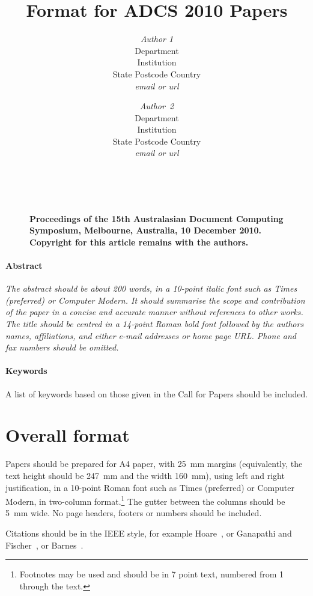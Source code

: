 \documentclass[twocolumn]{article}
\title{Format for ADCS 2010 Papers}
\author{{\em Author 1}\\[1ex]
        Department\\Institution\\State Postcode Country\\[1ex]
        {\em email or url} \and
        {\em Author~2}\\[1ex]
        Department\\Institution\\State Postcode Country\\[1ex]
        {\em email or url}}
\date{}
\begin{document}
\maketitle
\thispagestyle{empty}


        \begin{figure}[b]
	~\\
        \noindent
        {\small\raggedright\bf
        Proceedings of the 15th Australasian 
	Document Computing Symposium,
	Melbourne, Australia,
        10 December 2010.
	Copyright for this article remains with the authors.
        }
        \end{figure}


\paragraph*{Abstract}
\noindent
{\it 
The abstract should be about 200 words, in a 10-point italic
font such as Times (preferred) or Computer Modern.
It should summarise the scope and contribution of the paper in a
concise and accurate manner without references to other works.
The title should be centred in a 14-point Roman bold font followed by
the authors names, affiliations, and either e-mail addresses or home
page URL.
Phone and fax numbers should be omitted.
} 

\paragraph*{Keywords} 
A list of keywords based on those given in the Call for Papers should
be included.


\section{Overall format}

Papers should be prepared for A4 paper, with 25~mm margins
(equivalently, the text height should be 247~mm and the width 160~mm),
using left and right justification, in a 10-point Roman font such as
Times (preferred) or Computer Modern, in two-column
format.\footnote{Footnotes may be used and should be in 7 point text,
  numbered from 1 through the text.}  The gutter between the columns
should be 5~mm wide.  No page headers, footers or numbers should be
included.

Citations should be in the IEEE style, for example
Hoare~\cite{Hoare73}, or Ganapathi and
Fischer~\cite{GanapathiFischer82}, or Barnes~\cite{Barnes80,Barnes89}.
\end{document}
